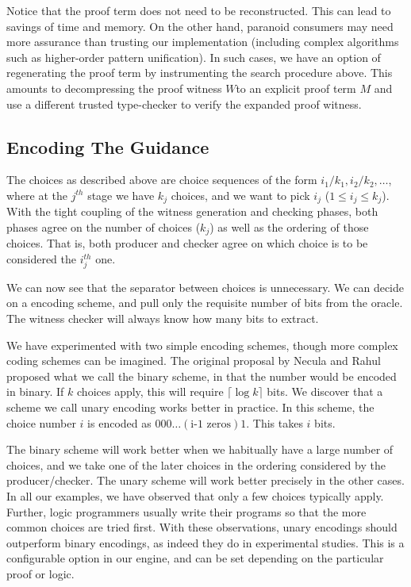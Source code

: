 \documentclass{acmconf}
\begin{document}
Notice that the proof term does not need to be reconstructed. This can
lead to savings of time and memory. On the other hand, paranoid
consumers may need more assurance than trusting our implementation
(including complex algorithms such as higher-order pattern
unification). In such cases, we have an option of regenerating the
proof term by instrumenting the search procedure above.  This amounts
to decompressing the proof witness $W$to an explicit proof term $M$
and use a different trusted type-checker to verify the expanded proof
witness.

\subsection{Encoding The Guidance}

The choices as described above are choice sequences of the form
$i_1/k_1,i_2/k_2,\ldots$, where at the $j^{th}$ stage we have $k_j$
choices, and we want to pick $i_j$ ($1 \leq i_j \leq k_j$). With the
tight coupling of the witness generation and checking phases, both
phases agree on the number of choices ($k_j$) as well as the ordering
of those choices. That is, both producer and checker agree on which
choice is to be considered the $i_j^{th}$ one.

We can now see that the separator between choices is unnecessary. We
can decide on a encoding scheme, and pull only the requisite number of
bits from the oracle. The witness checker will always know how many
bits to extract.

We have experimented with two simple encoding schemes, though more
complex coding schemes can be imagined. The original proposal by
Necula and Rahul proposed what we call the binary scheme, in that the
number would be encoded in binary. If $k$ choices apply, this will
require $\lceil\log k\rceil$ bits. We discover that a scheme we call
unary encoding works better in practice. In this scheme, the choice
number $i$ is encoded as $0 0 0 \ldots (\mbox{i-1 zeros}) 1$. This
takes $i$ bits.

The binary scheme will work better when we habitually have a large
number of choices, and we take one of the later choices in the
ordering considered by the producer/checker. The unary scheme will
work better precisely in the other cases. In all our examples, we have
observed that only a few choices typically apply. Further, logic
programmers usually write their programs so that the more common
choices are tried first. With these observations, unary encodings
should outperform binary encodings, as indeed they do in experimental
studies. This is a configurable option in our engine, and can be set
depending on the particular proof or logic.
\end{document}
